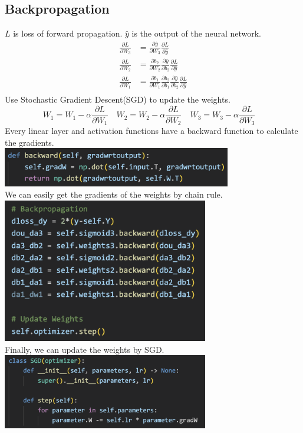 \documentclass{article} %
\begin{document}
    \subsection{Backpropagation}
    $L$ is loss of forward propagation. $\hat{y}$ is the output of the neural network.
    \[
    \begin{aligned}
    \frac{\partial L}{\partial W_3} &= \frac{\partial \hat{y}}{\partial W_3} \frac{\partial L}{\partial \hat{y}} \\
    \frac{\partial L}{\partial W_2} &= \frac{\partial b_2}{\partial W_2} \frac{\partial \hat{y}}{\partial b_2} \frac{\partial L}{\partial \hat{y}} \\
    \frac{\partial L}{\partial W_1} &= \frac{\partial b_1}{\partial W_1} \frac{\partial b_2}{\partial b_1} \frac{\partial \hat{y}}{\partial b_2} \frac{\partial L}{\partial \hat{y}} \\
    \end{aligned}
    \]Use Stochastic Gradient Descent(SGD) to update the weights. \\
    \[
    W_1 = W_1 - \alpha \frac{\partial L}{\partial W_1} \quad
    W_2 = W_2 - \alpha \frac{\partial L}{\partial W_2} \quad
    W_3 = W_3 - \alpha \frac{\partial L}{\partial W_3} \quad
    \]Every linear layer and activation functions have a backward function to calculate the gradients. \\
    \includegraphics[width=10cm]{./imgs/linear_back.png} \\
    We can easily get the gradients of the weights by chain rule. \\
    \includegraphics[width=9cm]{./imgs/backprop.png} \\
    Finally, we can update the weights by SGD. \\
    \includegraphics[width=9cm]{./imgs/SGD.png} \\
\end{document}
